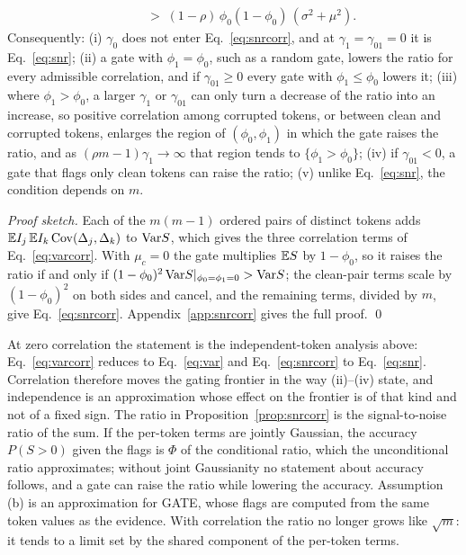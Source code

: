 \begin{proposition}
\begin{equation}
\begin{aligned}
&\qquad>\;(1-\rho)\,\phi_0(1-\phi_0)\,(\sigma^2+\mu^2).
\end{aligned}
\label{eq:snrcorr}
\end{equation}
Consequently:
(i) $\gamma_0$ does not enter Eq.~\eqref{eq:snrcorr}, and at $\gamma_1=\gamma_{01}=0$ it is Eq.~\eqref{eq:snr};
(ii) a gate with $\phi_1=\phi_0$, such as a random gate, lowers the ratio for every admissible correlation, and if $\gamma_{01}\ge0$ every
gate with $\phi_1\le\phi_0$ lowers it;
(iii) where $\phi_1>\phi_0$, a larger $\gamma_1$ or $\gamma_{01}$ can only turn a decrease of the ratio into an increase, so positive
correlation among corrupted tokens, or between clean and corrupted tokens, enlarges the region of $(\phi_0,\phi_1)$ in which the gate
raises the ratio, and as $(\rho m-1)\gamma_1\to\infty$ that region tends to $\{\phi_1>\phi_0\}$;
(iv) if $\gamma_{01}<0$, a gate that flags only clean tokens can raise the ratio;
(v) unlike Eq.~\eqref{eq:snr}, the condition depends on $m$.
\end{proposition}

\noindent\emph{Proof sketch.} Each of the $m(m-1)$ ordered pairs of distinct tokens adds $\mathbb{E} I_j\,\mathbb{E} I_k\,\mathrm{Cov}(\Delta_j,\Delta_k)$
to $\mathrm{Var} S$, which gives the three correlation terms of Eq.~\eqref{eq:varcorr}.
With $\mu_c=0$ the gate multiplies $\mathbb{E} S$ by $1-\phi_0$, so it raises the ratio if and only if
$(1-\phi_0)^2\,\mathrm{Var} S|_{\phi_0=\phi_1=0}>\mathrm{Var} S$; the clean-pair terms scale by $(1-\phi_0)^2$ on both sides and cancel, and the
remaining terms, divided by $m$, give Eq.~\eqref{eq:snrcorr}.
Appendix~\ref{app:snrcorr} gives the full proof. \qed

At zero correlation the statement is the independent-token analysis above: Eq.~\eqref{eq:varcorr} reduces to Eq.~\eqref{eq:var} and
Eq.~\eqref{eq:snrcorr} to Eq.~\eqref{eq:snr}.
Correlation therefore moves the gating frontier in the way (ii)--(iv) state, and independence is an approximation whose effect on the
frontier is of that kind and not of a fixed sign.
The ratio in Proposition~\ref{prop:snrcorr} is the signal-to-noise ratio of the sum.
If the per-token terms are jointly Gaussian, the accuracy $P(S>0)$ given the flags is $\Phi$ of the conditional ratio, which the
unconditional ratio approximates; without joint Gaussianity no statement about accuracy follows, and a gate can raise the ratio while
lowering the accuracy.
Assumption (b) is an approximation for GATE, whose flags are computed from the same token values as the evidence.
With correlation the ratio no longer grows like $\sqrt m$: it tends to a limit set by the shared component of the per-token terms.

